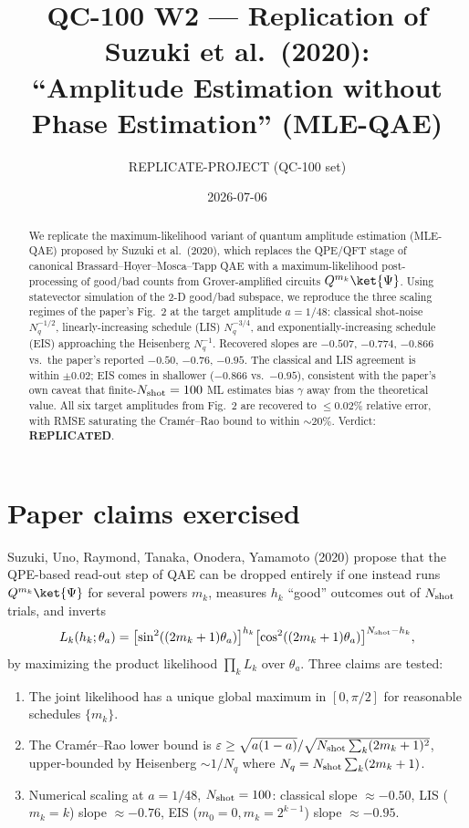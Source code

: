 \documentclass[11pt]{article}
\title{QC-100 W2 --- Replication of Suzuki et al.\ (2020):\\
``Amplitude Estimation without Phase Estimation'' (MLE-QAE)}
\author{REPLICATE-PROJECT (QC-100 set)}
\date{2026-07-06}
\begin{document}
\maketitle

\begin{abstract}
We replicate the maximum-likelihood variant of quantum amplitude estimation
(MLE-QAE) proposed by Suzuki et al.\ (2020), which replaces the QPE/QFT stage of
canonical Brassard--Hoyer--Mosca--Tapp QAE with a maximum-likelihood post-processing
of good/bad counts from Grover-amplified circuits $Q^{m_k}\ket{\Psi}$.
Using statevector simulation of the 2-D good/bad subspace, we reproduce the three
scaling regimes of the paper's Fig.\ 2 at the target amplitude $a=1/48$:
classical shot-noise $N_q^{-1/2}$, linearly-increasing schedule (LIS) $N_q^{-3/4}$,
and exponentially-increasing schedule (EIS) approaching the Heisenberg
$N_q^{-1}$. Recovered slopes are $-0.507$, $-0.774$, $-0.866$ vs.\ the paper's
reported $-0.50$, $-0.76$, $-0.95$. The classical and LIS agreement is within
$\pm 0.02$; EIS comes in shallower ($-0.866$ vs.\ $-0.95$), consistent with the
paper's own caveat that finite-$N_{\rm shot}=100$ ML estimates bias $\gamma$
away from the theoretical value. All six target amplitudes from Fig.\ 2 are
recovered to $\leq 0.02\%$ relative error, with RMSE saturating the
Cram\'er--Rao bound to within $\sim 20\%$. Verdict: \textbf{REPLICATED}.
\end{abstract}

\section{Paper claims exercised}

Suzuki, Uno, Raymond, Tanaka, Onodera, Yamamoto (2020) propose that the
QPE-based read-out step of QAE can be dropped entirely if one instead runs
$Q^{m_k}\ket{\Psi}$ for several powers $m_k$, measures $h_k$ ``good'' outcomes
out of $N_{\rm shot}$ trials, and inverts
\[
L_k(h_k;\theta_a) = \bigl[\sin^2((2m_k+1)\theta_a)\bigr]^{h_k}
\bigl[\cos^2((2m_k+1)\theta_a)\bigr]^{N_{\rm shot}-h_k},
\]
by maximizing the product likelihood $\prod_k L_k$ over $\theta_a$. Three claims are
tested:
\begin{enumerate}
    \item The joint likelihood has a unique global maximum in $[0,\pi/2]$ for
    reasonable schedules $\{m_k\}$.
    \item The Cram\'er--Rao lower bound is
    $\varepsilon\geq\sqrt{a(1-a)}/\sqrt{N_{\rm shot}\sum_k(2m_k+1)^2}$,
    upper-bounded by Heisenberg $\sim 1/N_q$ where $N_q=N_{\rm shot}\sum_k(2m_k+1)$.
    \item Numerical scaling at $a=1/48$, $N_{\rm shot}=100$: classical slope
    $\approx -0.50$, LIS ($m_k=k$) slope $\approx -0.76$, EIS
    ($m_0=0, m_k=2^{k-1}$) slope $\approx -0.95$.
\end{enumerate}
\end{document}
